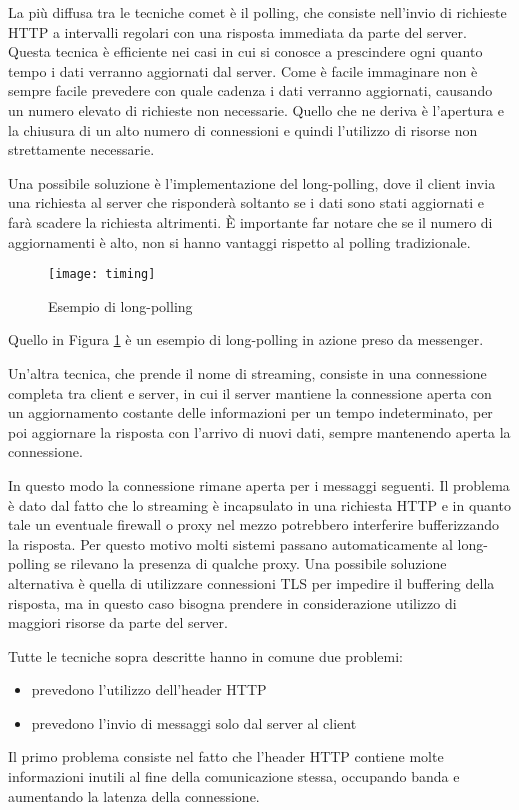 La più diffusa tra le tecniche comet è il polling, che consiste nell'invio di richieste HTTP a intervalli regolari con una risposta immediata da parte del server. 
Questa tecnica è efficiente nei casi in cui si conosce a prescindere ogni quanto tempo i dati verranno aggiornati dal server.
Come è facile immaginare non è sempre facile prevedere con quale cadenza i dati verranno aggiornati, causando un numero elevato di richieste non necessarie.
Quello che ne deriva è l'apertura e la chiusura di un alto numero di connessioni e quindi l'utilizzo di risorse non strettamente necessarie.

Una possibile soluzione è l'implementazione del long-polling, dove il client invia una richiesta al server che risponderà soltanto se i dati sono stati aggiornati e farà scadere la richiesta altrimenti. È importante far notare che se il numero di aggiornamenti è alto, non si hanno vantaggi rispetto al polling tradizionale.
\begin{figure}[htpb!]
  \centering
  \texttt{[image: timing]}
  \caption{Esempio di long-polling}
  \label{fig:timing}
\end{figure}
Quello in Figura \ref{fig:timing} è un esempio di long-polling in azione preso da messenger. 

Un'altra tecnica, che prende il nome di streaming, consiste in una connessione completa tra client e server, in cui il server mantiene la connessione aperta con un aggiornamento costante delle informazioni per un tempo indeterminato, per poi aggiornare la risposta con l'arrivo di nuovi dati, sempre mantenendo aperta la connessione.

In questo modo la connessione rimane aperta per i messaggi seguenti.
Il problema è dato dal fatto che lo streaming è incapsulato in una richiesta HTTP e in quanto tale un eventuale firewall o proxy nel mezzo potrebbero interferire bufferizzando la risposta.
Per questo motivo molti sistemi passano automaticamente al long-polling se rilevano la presenza di qualche proxy.
Una possibile soluzione alternativa è quella di utilizzare connessioni TLS per impedire il buffering della risposta,
ma in questo caso bisogna prendere in considerazione utilizzo di
maggiori risorse da parte del server.

Tutte le tecniche sopra descritte hanno in comune due problemi:
\begin{itemize}
\item prevedono l'utilizzo dell'header HTTP
\item prevedono l'invio di messaggi solo dal server al client
\end{itemize}
Il primo problema consiste nel fatto che l'header HTTP contiene molte informazioni inutili al fine della comunicazione stessa, occupando banda e aumentando la latenza della connessione.


